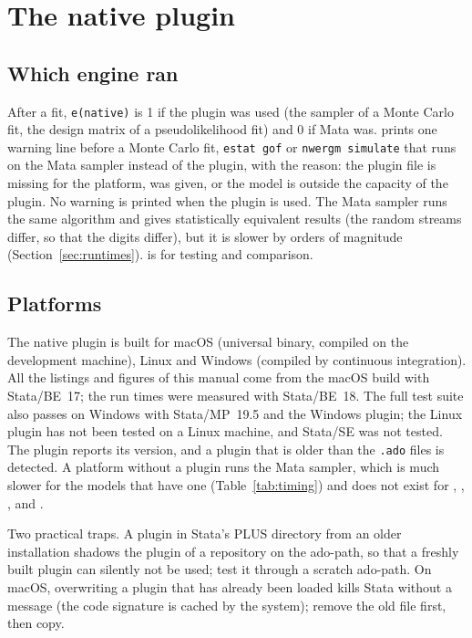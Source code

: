 \section{The native plugin}\label{sec:platforms}

\subsection{Which engine ran}

After a fit, \texttt{e(native)} is 1 if the plugin was used (the sampler of a Monte Carlo fit, the design matrix of a pseudolikelihood fit) and 0 if Mata was. \nwergm{} prints one warning line before a Monte Carlo fit, \texttt{estat gof} or \texttt{nwergm simulate} that runs on the Mata sampler instead of the plugin, with the reason: the plugin file is missing for the platform,  was given, or the model is outside the capacity of the plugin. No warning is printed when the plugin is used. The Mata sampler runs the same algorithm and gives statistically equivalent results (the random streams differ, so that the digits differ), but it is slower by orders of magnitude (Section~\ref{sec:runtimes}).  is for testing and comparison.

\subsection{Platforms}

The native plugin is built for macOS (universal binary, compiled on the development machine), Linux and Windows (compiled by continuous integration). All the listings and figures of this manual come from the macOS build with Stata/BE~17; the run times were measured with Stata/BE~18. The full test suite also passes on Windows with Stata/MP~19.5 and the Windows plugin; the Linux plugin has not been tested on a Linux machine, and Stata/SE was not tested. The plugin reports its version, and a plugin that is older than the \texttt{.ado} files is detected. A platform without a plugin runs the Mata sampler, which is much slower for the models that have one (Table~\ref{tab:timing}) and does not exist for , , ,  and .

Two practical traps. A plugin in Stata's PLUS directory from an older installation shadows the plugin of a repository on the ado-path, so that a freshly built plugin can silently not be used; test it through a scratch ado-path. On macOS, overwriting a plugin that has already been loaded kills Stata without a message (the code signature is cached by the system); remove the old file first, then copy.

